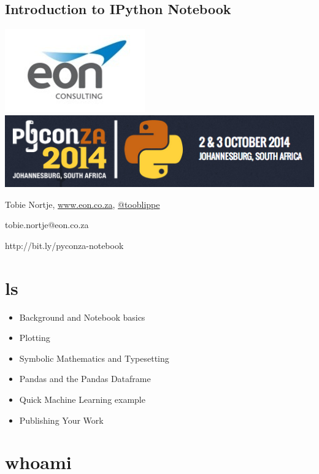 \documentclass{article}
\begin{document}
    \subsection{Introduction to IPython Notebook}

\includegraphics{static/img/eon.png}
\includegraphics{static/img/pyconza.png}

Tobie Nortje, \href{http://www.eon.co.za}{www.eon.co.za},
\href{http://twitter.com/tooblippe}{@tooblippe}

tobie.nortje@eon.co.za

http://bit.ly/pyconza-notebook

    \section{ls}

\begin{itemize}
\itemsep1pt\parskip0pt
\item
  Background and Notebook basics
\item
  Plotting
\item
  Symbolic Mathematics and Typesetting
\item
  Pandas and the Pandas Dataframe
\item
  Quick Machine Learning example
\item
  Publishing Your Work
\end{itemize}

    \section{whoami}
\end{document}
